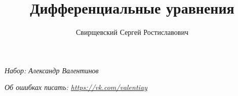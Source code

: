 \documentclass{article}
\author{Свирщевский Сергей Ростиславович}
\title{Дифференциальные уравнения}
\begin{document}
  \begin{titlepage}
  \maketitle
  \begin{center}
  {\itshape\footnotesize Набор: Александр Валентинов}
  
  {\itshape\footnotesize Об ошибках писать: \url{https://vk.com/valentiay}}
  \end{center}
  \tableofcontents
  \vfill
  \end{titlepage}
  
  
  
  
  
  
  
  
\end{document}

